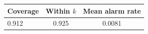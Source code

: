 \begin{tabular}{lcc}
\toprule
Coverage & Within $k$ & Mean alarm rate \\
\midrule
0.912 & 0.925 & 0.0081 \\
\bottomrule
\end{tabular}
